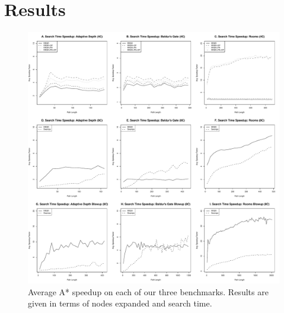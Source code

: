 \section{Results}
\label{sec-results}


\begin{figure}[t]
       \begin{center}
                       \includegraphics[width=1.95\columnwidth, trim = 10mm 10mm 10mm 0mm]{diagrams/speedup.pdf}
       \end{center}
       \caption{Average A* speedup on each of our three benchmarks. 
		Results are given in terms of nodes expanded and search time.}
\label{fig-speedup}
\end{figure}

